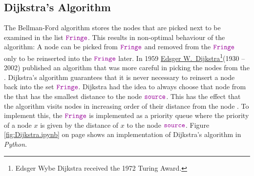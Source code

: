 \subsection{Dijkstra's Algorithm \label{sec:dijkstra}}
The Bellman-Ford algorithm stores the nodes that are picked next to be examined in the list $\mytt{Fringe}$.
This results in non-optimal behaviour of the algorithm:  A node can be picked from $\mytt{Fringe}$ and
removed from the $\mytt{Fringe}$ only to be reinserted into the $\mytt{Fringe}$ later.  In 1959
\href{https://en.wikipedia.org/wiki/Edsger_W._Dijkstra}{Edsger W.~Dijkstra}\footnote{
  Edsger Wybe Dijkstra received the 1972 Turing Award.}(1930 -- 2002) \cite{dijkstra:59}
published an algorithm that was more careful in picking the nodes from the .  Dijkstra's algorithm guarantees that it
is never necessary to reinsert a node back into the set $\mytt{Fringe}$.  Dijkstra had the idea to always choose
that node from the  that has the smallest distance to the node $\mytt{source}$.  This has the effect that the algorithm
visits nodes in increasing order of their distance from the node .  
To implement this,  the $\mytt{Fringe}$ is implemented as a priority queue where the priority of a node $x$ is
given by the distance of $x$ to the node $\mytt{source}$.  Figure \ref{fig:Dijkstra.ipynb} on page
\pageref{fig:Dijkstra.ipynb} shows an implementation of Dijkstra's algorithm 
in \textsl{Python}.



